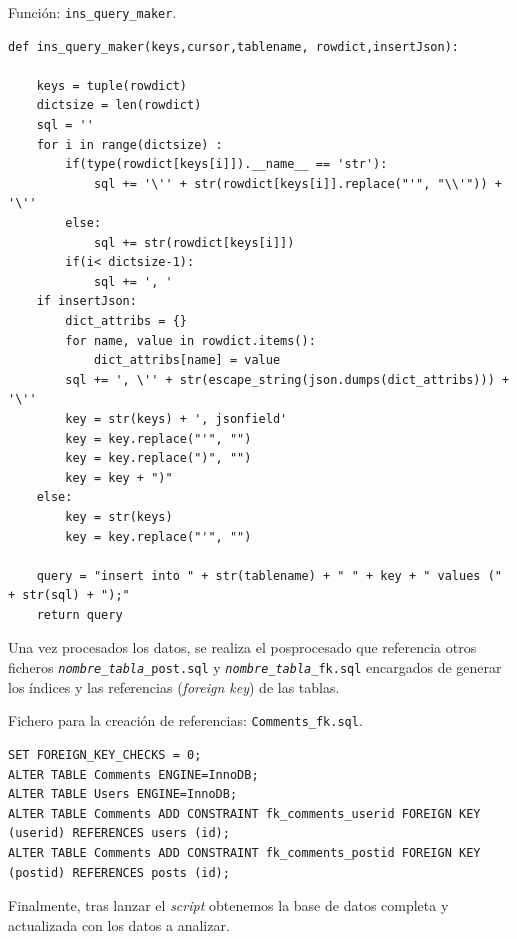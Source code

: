 \documentclass[a4paper, 12pt]{book}
\begin{document}
\begin{listing}[t]
    \caption{Función: \texttt{ins\_query\_maker}.}{}
    \label{lst:1}
    \begin{verbatim}
def ins_query_maker(keys,cursor,tablename, rowdict,insertJson):
   
    keys = tuple(rowdict)
    dictsize = len(rowdict)
    sql = ''
    for i in range(dictsize) :
        if(type(rowdict[keys[i]]).__name__ == 'str'):
            sql += '\'' + str(rowdict[keys[i]].replace("'", "\\'")) + '\''
        else:
            sql += str(rowdict[keys[i]])
        if(i< dictsize-1):
            sql += ', '
    if insertJson:
        dict_attribs = {}
        for name, value in rowdict.items():
            dict_attribs[name] = value
        sql += ', \'' + str(escape_string(json.dumps(dict_attribs))) + '\''
        key = str(keys) + ', jsonfield'
        key = key.replace("'", "")
        key = key.replace(")", "")
        key = key + ")"
    else:
        key = str(keys)
        key = key.replace("'", "")

    query = "insert into " + str(tablename) + " " + key + " values (" + str(sql) + ");"
    return query
    \end{verbatim}
\end{listing}

\clearpage
Una vez procesados los datos, se realiza el posprocesado que referencia otros ficheros \texttt{\emph{nombre\_tabla}\_post.sql} y \texttt{\emph{nombre\_tabla}\_fk.sql} encargados de generar los índices y las referencias (\textit{foreign key}) de las tablas.

\begin{listing}[t]
    \caption{Fichero para la creación de referencias: \texttt{Comments\_fk.sql}.}{}
    \label{lst:2}
    \begin{verbatim}
SET FOREIGN_KEY_CHECKS = 0;
ALTER TABLE Comments ENGINE=InnoDB;
ALTER TABLE Users ENGINE=InnoDB;
ALTER TABLE Comments ADD CONSTRAINT fk_comments_userid FOREIGN KEY (userid) REFERENCES users (id);
ALTER TABLE Comments ADD CONSTRAINT fk_comments_postid FOREIGN KEY (postid) REFERENCES posts (id);
    \end{verbatim}
\end{listing}

Finalmente, tras lanzar el \emph{script} obtenemos la base de datos completa y actualizada con los datos a analizar.
\end{document}
